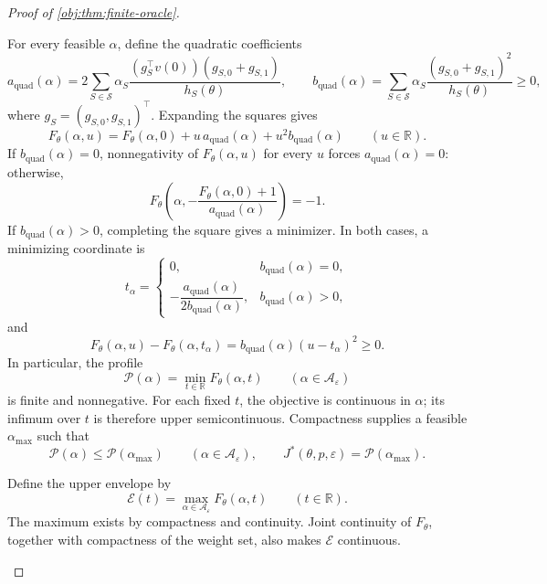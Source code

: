 \begin{proof}[Proof of \cref{obj:thm:finite-oracle}]
\begin{enumerate}
For every feasible \(\alpha\), define the quadratic coefficients
\[
a_{\mathrm{quad}}(\alpha)
=
2\sum_{S\in\mathcal S}
\alpha_S
\frac{(g_S^\top v(0))(g_{S,0}+g_{S,1})}{h_S(\theta)},
\qquad
b_{\mathrm{quad}}(\alpha)
=
\sum_{S\in\mathcal S}
\alpha_S
\frac{(g_{S,0}+g_{S,1})^2}{h_S(\theta)}\ge0,
\]
where \(g_S=(g_{S,0},g_{S,1})^\top\). Expanding the squares gives
\[
F_\theta(\alpha,u)
=
F_\theta(\alpha,0)
+u\,a_{\mathrm{quad}}(\alpha)
+u^2b_{\mathrm{quad}}(\alpha)
\qquad(u\in\mathbb R).
\]
If \(b_{\mathrm{quad}}(\alpha)=0\), nonnegativity of
\(F_\theta(\alpha,u)\) for every \(u\) forces
\(a_{\mathrm{quad}}(\alpha)=0\): otherwise,
\[
F_\theta\!\left(
\alpha,-\frac{F_\theta(\alpha,0)+1}{a_{\mathrm{quad}}(\alpha)}
\right)=-1.
\]
If \(b_{\mathrm{quad}}(\alpha)>0\), completing the square gives a
minimizer. In both cases, a minimizing coordinate is
\[
t_\alpha=
\begin{cases}
0,&b_{\mathrm{quad}}(\alpha)=0,\\[2mm]
-\dfrac{a_{\mathrm{quad}}(\alpha)}
{2b_{\mathrm{quad}}(\alpha)},
&b_{\mathrm{quad}}(\alpha)>0,
\end{cases}
\]
and
\[
F_\theta(\alpha,u)-F_\theta(\alpha,t_\alpha)
=
b_{\mathrm{quad}}(\alpha)(u-t_\alpha)^2\ge0.
\]
In particular, the profile
\[
\mathscr P(\alpha)=\min_{t\in\mathbb R}F_\theta(\alpha,t)
\qquad(\alpha\in\mathcal A_\varepsilon)
\]
is finite and nonnegative. For each fixed \(t\), the objective is
continuous in \(\alpha\); its infimum over \(t\) is therefore upper
semicontinuous. Compactness supplies a feasible
\(\alpha_{\max}\) such that
\[
\mathscr P(\alpha)\le\mathscr P(\alpha_{\max})
\qquad(\alpha\in\mathcal A_\varepsilon),
\qquad
J^*(\theta,p,\varepsilon)=\mathscr P(\alpha_{\max}).
\]

Define the upper envelope by
\[
\mathscr E(t)=
\max_{\alpha\in\mathcal A_\varepsilon}F_\theta(\alpha,t)
\qquad(t\in\mathbb R).
\]
The maximum exists by compactness and continuity. Joint continuity
of \(F_\theta\), together with compactness of the weight set, also
makes \(\mathscr E\) continuous.


\end{enumerate}
\end{proof}
